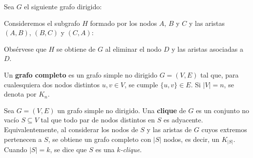         \begin{ejemplo}[Subgrafo]
            Sea $G$ el siguiente grafo dirigido:

            \begin{center}
            \end{center}

            Consideremos el subgrafo $H$ formado por los nodos $A$, $B$ y $C$ y las aristas $(A,B)$, $(B,C)$ y $(C,A)$:

            \begin{center}
            \end{center}

            Obsérvese que $H$ se obtiene de $G$ al eliminar el nodo $D$ y las aristas asociadas a $D$.
        \end{ejemplo}

        \begin{definicion}
            Un \textbf{grafo completo} es un grafo simple no dirigido $G=(V,E)$ tal que, para cualesquiera dos nodos distintos $u,v\in V$, se cumple $\{u,v\}\in E$. Si $|V|=n$, se denota por $K_n$.
        \end{definicion}

        \begin{definicion}[Clique]
            Sea $G=(V,E)$ un grafo simple no dirigido. Una \textbf{clique} de $G$ es un conjunto no vacío $S\subseteq V$ tal que todo par de nodos distintos en $S$ es adyacente. Equivalentemente, al considerar los nodos de $S$ y las aristas de $G$ cuyos extremos pertenecen a $S$, se obtiene un grafo completo con $|S|$ nodos, es decir, un $K_{|S|}$. Cuando $|S|=k$, se dice que $S$ es una \emph{$k$-clique}.
        \end{definicion}


